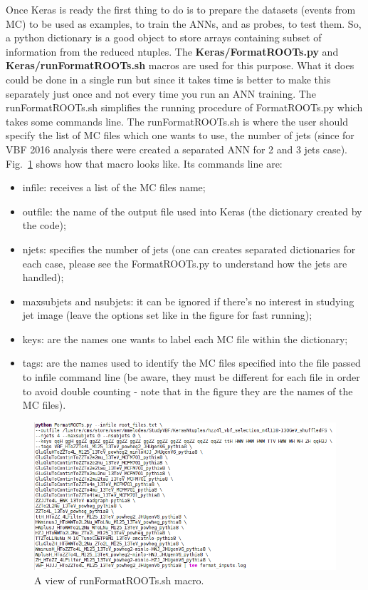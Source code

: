 \documentclass[]{report}
\begin{document}
Once Keras is ready the first thing to do is to prepare the datasets (events from MC) to be used as examples, to train the ANNs, and as probes, to test them. So, a python dictionary is a good object to store arrays containing subset of information from the reduced ntuples. The \textbf{Keras/FormatROOTs.py} and \textbf{Keras/runFormatROOTs.sh} macros are used for this purpose. What it does could be done in a single run but since it takes time is better to make this separately just once and not every time you run an ANN training. The runFormatROOTs.sh simplifies the running procedure of FormatROOTs.py which takes some commands line. The runFormatROOTs.sh is where the user should specify the list of MC files which one wants to use, the number of jets (since for VBF 2016 analysis there were created a separated ANN for 2 and 3 jets case). Fig.~\ref{fig:formatimputssh} shows how that macro looks like. Its commands line are:
\begin{itemize}
	\item infile: receives a list of the MC files name;
	\item outfile: the name of the output file used into Keras (the dictionary created by the code);
	\item njets: specifies the number of jets (one can creates separated dictionaries for each case, please see the FormatROOTs.py to understand how the jets are handled);
	\item maxsubjets and nsubjets: it can be ignored if there's no interest in studying jet image (leave the options set like in the figure for fast running);
	\item keys: are the names one wants to label each MC file within the dictionary;
	\item tags: are the names used to identify the MC files specified into the file passed to infile command line (be aware, they must be different for each file in order to avoid double counting - note that in the figure they are the names of the MC files).
\end{itemize}

\begin{figure}
	\label{fig:formatimputssh}
	\centering
	\caption{A view of runFormatROOTs.sh macro.}
	\includegraphics[scale=0.8]{figs/formatimputssh}
\end{figure}
\end{document}
